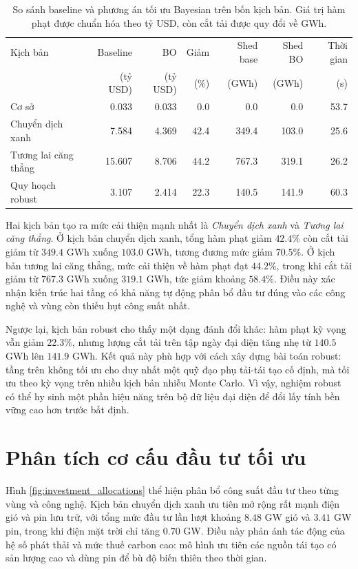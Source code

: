 \begin{table}[!ht]
    \centering
    \caption{So sánh baseline và phương án tối ưu Bayesian trên bốn kịch bản. Giá trị hàm phạt được chuẩn hóa theo tỷ USD, còn cắt tải được quy đổi về GWh.}
    \label{tab:scenario_results}
    \scriptsize
    \begin{tabular}{lrrrrrr}
        \hline
        Kịch bản & Baseline & BO & Giảm & Shed base & Shed BO & Thời gian \\
         & (tỷ USD) & (tỷ USD) & (\%) & (GWh) & (GWh) & (s) \\
        \hline
        Cơ sở & 0.033 & 0.033 & 0.0 & 0.0 & 0.0 & 53.7 \\
        Chuyển dịch xanh & 7.584 & 4.369 & 42.4 & 349.4 & 103.0 & 25.6 \\
        Tương lai căng thẳng & 15.607 & 8.706 & 44.2 & 767.3 & 319.1 & 26.2 \\
        Quy hoạch robust & 3.107 & 2.414 & 22.3 & 140.5 & 141.9 & 60.3 \\
        \hline
    \end{tabular}
\end{table}

Hai kịch bản tạo ra mức cải thiện mạnh nhất là \textit{Chuyển dịch xanh} và \textit{Tương lai căng thẳng}. Ở kịch bản chuyển dịch xanh, tổng hàm phạt giảm $42.4\%$ còn cắt tải giảm từ $349.4$ GWh xuống $103.0$ GWh, tương đương mức giảm $70.5\%$. Ở kịch bản tương lai căng thẳng, mức cải thiện về hàm phạt đạt $44.2\%$, trong khi cắt tải giảm từ $767.3$ GWh xuống $319.1$ GWh, tức giảm khoảng $58.4\%$. Điều này xác nhận kiến trúc hai tầng có khả năng tự động phân bổ đầu tư đúng vào các công nghệ và vùng còn thiếu hụt công suất nhất.

Ngược lại, kịch bản robust cho thấy một dạng đánh đổi khác: hàm phạt kỳ vọng vẫn giảm $22.3\%$, nhưng lượng cắt tải trên tập ngày đại diện tăng nhẹ từ $140.5$ GWh lên $141.9$ GWh. Kết quả này phù hợp với cách xây dựng bài toán robust: tầng trên không tối ưu cho duy nhất một quỹ đạo phụ tải-tái tạo cố định, mà tối ưu theo kỳ vọng trên nhiều kịch bản nhiễu Monte Carlo. Vì vậy, nghiệm robust có thể hy sinh một phần hiệu năng trên bộ dữ liệu đại diện để đổi lấy tính bền vững cao hơn trước bất định.

\section{Phân tích cơ cấu đầu tư tối ưu}

Hình \ref{fig:investment_allocations} thể hiện phân bổ công suất đầu tư theo từng vùng và công nghệ. Kịch bản chuyển dịch xanh ưu tiên mở rộng rất mạnh điện gió và pin lưu trữ, với tổng mức đầu tư lần lượt khoảng $8.48$ GW gió và $3.41$ GW pin, trong khi điện mặt trời chỉ tăng $0.70$ GW. Điều này phản ánh tác động của hệ số phát thải và mức thuế carbon cao: mô hình ưu tiên các nguồn tái tạo có sản lượng cao và dùng pin để bù độ biến thiên theo thời gian.

